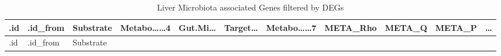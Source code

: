 \documentclass[
]{article}
\begin{document}
\begin{longtable}[]{@{}lllllllllll@{}}
\caption{\label{tab:Liver-Microbiota-associated-Genes-filtered-by-DEGs}Liver Microbiota associated Genes filtered by DEGs}\tabularnewline
\toprule
\begin{minipage}[b]{0.03\columnwidth}\raggedright
.id\strut
\end{minipage} & \begin{minipage}[b]{0.07\columnwidth}\raggedright
.id\_from\strut
\end{minipage} & \begin{minipage}[b]{0.07\columnwidth}\raggedright
Substrate\strut
\end{minipage} & \begin{minipage}[b]{0.09\columnwidth}\raggedright
Metabo\ldots\ldots4\strut
\end{minipage} & \begin{minipage}[b]{0.07\columnwidth}\raggedright
Gut.Mi\ldots{}\strut
\end{minipage} & \begin{minipage}[b]{0.07\columnwidth}\raggedright
Target\ldots{}\strut
\end{minipage} & \begin{minipage}[b]{0.09\columnwidth}\raggedright
Metabo\ldots\ldots7\strut
\end{minipage} & \begin{minipage}[b]{0.07\columnwidth}\raggedright
META\_Rho\strut
\end{minipage} & \begin{minipage}[b]{0.07\columnwidth}\raggedright
META\_Q\strut
\end{minipage} & \begin{minipage}[b]{0.07\columnwidth}\raggedright
META\_P\strut
\end{minipage} & \begin{minipage}[b]{0.03\columnwidth}\raggedright
\ldots{}\strut
\end{minipage}\tabularnewline
\midrule
\endfirsthead
\toprule
\begin{minipage}[b]{0.03\columnwidth}\raggedright
.id\strut
\end{minipage} & \begin{minipage}[b]{0.07\columnwidth}\raggedright
.id\_from\strut
\end{minipage} & \begin{minipage}[b]{0.07\columnwidth}\raggedright
Substrate\strut
\end{minipage} & \begin{minipage}[b]{0.09\columnwidth}\raggedright

\end{minipage}
\end{longtable}
\end{document}

